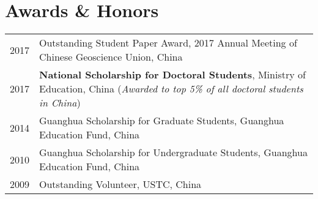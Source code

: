 \section*{Awards \& Honors}

\begin{tabular}{p{} p{}}
2017 & Outstanding Student Paper Award, 2017 Annual Meeting of Chinese Geoscience Union, China \\
2017 & \textbf{National Scholarship for Doctoral Students}, Ministry of Education, China \newline
        (\textit{Awarded to top 5\% of all doctoral students in China}) \\
2014 & Guanghua Scholarship for Graduate Students, Guanghua Education Fund, China \\
2010 & Guanghua Scholarship for Undergraduate Students, Guanghua Education Fund, China \\
2009 & Outstanding Volunteer, USTC, China \\
\end{tabular}
